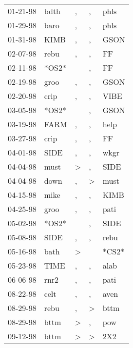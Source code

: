 \begin{supertabular}{lllll}
 01-21-98 &   bdth &                , &             , &   phls \\
 01-29-98 &   baro &                , &             , &   phls \\
 01-31-98 &   KIMB &                , &             , &   GSON \\
 02-07-98 &   rebu &                , &             , &     FF \\
 02-11-98 &  *OS2* &                  &             , &     FF \\
 02-19-98 &   groo &                , &             , &   GSON \\
 02-20-98 &   crip &                , &             , &   VIBE \\
 03-05-98 &  *OS2* &                  &             , &   GSON \\
 03-19-98 &   FARM &                , &             , &   help \\
 03-27-98 &   crip &                , &             , &     FF \\
 04-01-98 &   SIDE &                , &             , &   wkgr \\
 04-04-98 &   must &     \textgreater &             , &   SIDE \\
 04-04-98 &   down &                , &  \textgreater &   must \\
 04-15-98 &   mike &                , &             , &   KIMB \\
 04-25-98 &   groo &                , &             , &   pati \\
 05-02-98 &  *OS2* &                  &             , &   SIDE \\
 05-08-98 &   SIDE &                , &             , &   rebu \\
 05-16-98 &   bath &     \textgreater &               &  *CS2* \\
 05-23-98 &   TIME &                , &             , &   alab \\
 06-06-98 &   rnr2 &                , &             , &   pati \\
 08-22-98 &   celt &                , &             , &   aven \\
 08-29-98 &   rebu &                , &  \textgreater &   bttm \\
 08-29-98 &   bttm &     \textgreater &             , &    pow \\
 09-12-98 &   bttm &     \textgreater &  \textgreater &    2X2 \\

\end{supertabular}
